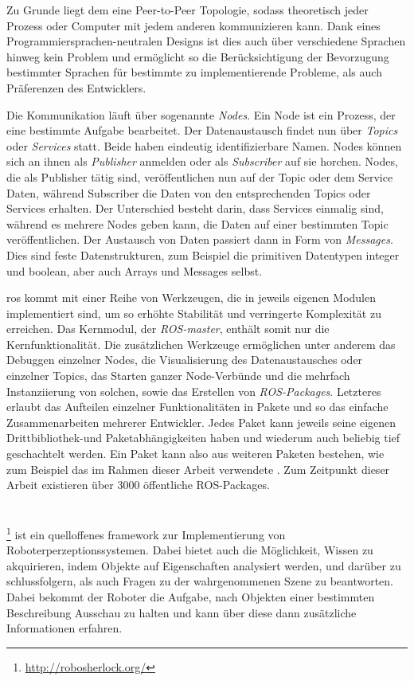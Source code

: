 Zu Grunde liegt dem eine Peer-to-Peer Topologie, sodass theoretisch jeder Prozess oder Computer mit jedem anderen kommunizieren kann. Dank eines Programmiersprachen-neutralen Designs ist dies auch über verschiedene Sprachen hinweg kein Problem und ermöglicht so die Berücksichtigung der Bevorzugung bestimmter Sprachen für bestimmte zu implementierende Probleme, als auch Präferenzen des Entwicklers.\par

Die Kommunikation läuft über sogenannte \textit{Nodes}. Ein Node ist ein Prozess, der eine bestimmte Aufgabe bearbeitet. Der Datenaustausch findet nun über \textit{Topics} oder \textit{Services} statt. Beide haben eindeutig identifizierbare Namen. Nodes können sich an ihnen als \textit{Publisher} anmelden oder als \textit{Subscriber} auf sie horchen. Nodes, die als Publisher tätig sind, veröffentlichen nun auf der Topic oder dem Service Daten, während Subscriber die Daten von den entsprechenden Topics oder Services erhalten. Der Unterschied besteht darin, dass Services einmalig sind, während es mehrere Nodes geben kann, die Daten auf einer bestimmten Topic veröffentlichen. Der Austausch von Daten passiert dann in Form von \textit{Messages}. Dies sind feste Datenstrukturen, zum Beispiel die primitiven Datentypen integer und boolean, aber auch Arrays und Messages selbst. \par

\gls{ros} kommt mit einer Reihe von Werkzeugen, die in jeweils eigenen Modulen implementiert sind, um so erhöhte Stabilität und verringerte Komplexität zu erreichen. Das Kernmodul, der \textit{ROS-master}, enthält somit nur die Kernfunktionalität. Die zusätzlichen Werkzeuge ermöglichen unter anderem das Debuggen einzelner Nodes, die Visualisierung des Datenaustausches oder einzelner Topics, das Starten ganzer Node-Verbünde und die mehrfach Instanziierung von solchen, sowie das Erstellen von \textit{ROS-Packages}. Letzteres erlaubt das Aufteilen einzelner Funktionalitäten in Pakete und so das einfache Zusammenarbeiten mehrerer Entwickler. Jedes Paket kann jeweils seine eigenen Drittbibliothek-und Paketabhängigkeiten haben und wiederum auch beliebig tief geschachtelt werden. Ein Paket kann also aus weiteren Paketen bestehen, wie zum Beispiel das im Rahmen dieser Arbeit verwendete \robosherlock. Zum Zeitpunkt dieser Arbeit existieren über 3000 öffentliche ROS-Packages.   

\section{\robosherlock}
\label{sec:robosherlock}
\robosherlock\footnote{\url{http://robosherlock.org/}} \cite{robosherlock} ist ein quelloffenes \gls{framework} zur Implementierung von Roboterperzeptionssystemen. Dabei bietet \robosherlock auch die Möglichkeit, Wissen zu akquirieren, indem Objekte auf Eigenschaften analysiert werden, und darüber zu schlussfolgern, als auch Fragen zu der wahrgenommenen Szene zu beantworten. Dabei bekommt der Roboter die Aufgabe, nach Objekten einer bestimmten Beschreibung Ausschau zu halten und kann über diese dann zusätzliche Informationen erfahren.\par

